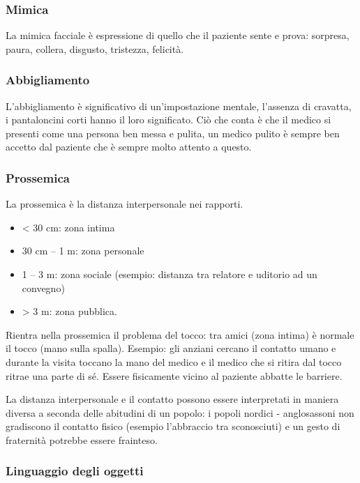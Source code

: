 \subsubsection{Mimica}

La mimica facciale è espressione di quello che il paziente sente e
prova: sorpresa, paura, collera, disgusto, tristezza, felicità.

\subsubsection{Abbigliamento}

L'abbigliamento è significativo di un'impostazione mentale, l'assenza di
cravatta, i pantaloncini corti hanno il loro significato. Ciò che conta
è che il medico si presenti come una persona ben messa e pulita, un
medico pulito è sempre ben accetto dal paziente che è sempre molto
attento a questo.

\subsubsection{Prossemica}

La prossemica è la distanza interpersonale nei rapporti.

\begin{itemize}
\item
  \textless{} 30 cm: zona intima
\item
  30 cm -- 1 m: zona personale
\item
  1 -- 3 m: zona sociale (esempio: distanza tra relatore e uditorio ad
  un convegno)
\item
  \textgreater{} 3 m: zona pubblica.
\end{itemize}

Rientra nella prossemica il problema del tocco: tra amici (zona intima)
è normale il tocco (mano sulla spalla). Esempio: gli anziani cercano il
contatto umano e durante la visita toccano la mano del medico e il
medico che si ritira dal tocco ritrae una parte di sé. Essere
fisicamente vicino al paziente abbatte le barriere.

La distanza interpersonale e il contatto possono essere interpretati in
maniera diversa a seconda delle abitudini di un popolo: i popoli nordici
- anglosassoni non gradiscono il contatto fisico (esempio l'abbraccio
tra sconosciuti) e un gesto di fraternità potrebbe essere frainteso.

\subsubsection{Linguaggio degli oggetti}

